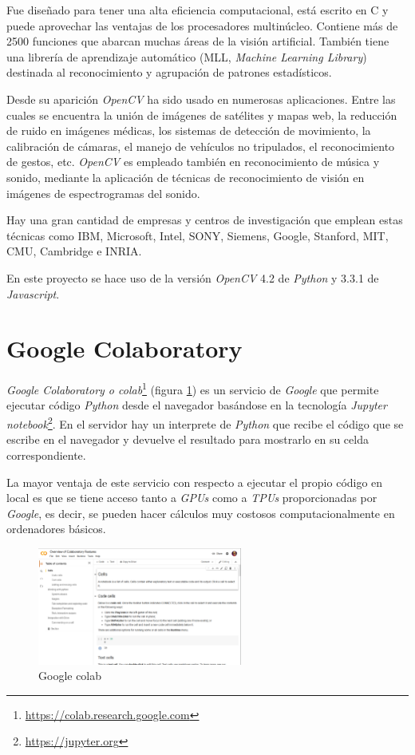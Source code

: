 Fue diseñado para tener una alta eficiencia computacional, está escrito en C y puede aprovechar las ventajas de los procesadores multinúcleo. Contiene más  de  2500  funciones  que  abarcan  muchas  áreas  de  la  visión  artificial.  También  tiene  una librería   de   aprendizaje   automático   (MLL,  \textit{Machine   Learning   Library})   destinada   al reconocimiento  y agrupación de patrones estadísticos.

Desde su aparición \textit{OpenCV} ha sido usado en numerosas aplicaciones. Entre las cuales se encuentra la unión de imágenes de satélites y mapas web, la reducción de ruido en imágenes  médicas,  los  sistemas  de  detección  de movimiento,  la  calibración  de  cámaras,  el manejo  de  vehículos  no  tripulados, el  reconocimiento  de  gestos, etc. \textit{OpenCV} es empleado también en reconocimiento de música y sonido, mediante la aplicación de técnicas de reconocimiento de visión en imágenes de espectrogramas del sonido.

Hay  una  gran  cantidad  de  empresas    y  centros  de  investigación  que  emplean  estas técnicas como IBM, Microsoft, Intel, SONY, Siemens, Google, Stanford, MIT, CMU, Cambridge e INRIA.

En este proyecto se hace uso de la versión \textit{OpenCV} 4.2 de \textit{Python} y 3.3.1 de \textit{Javascript}.
\section{Google Colaboratory}
\textit{Google Colaboratory o colab}\footnote{\url{https://colab.research.google.com}} (figura \ref{fig:colab})  es un servicio de \textit{Google} que permite ejecutar código \textit{Python} desde el navegador basándose en la tecnología \textit{Jupyter notebook}\footnote{\url{https://jupyter.org}}. En el servidor hay un interprete de \textit{Python} que recibe el código que se escribe en el navegador y devuelve el resultado para mostrarlo en su celda correspondiente.

La mayor ventaja de este servicio con respecto a ejecutar el propio código en local es que se tiene acceso tanto a \textit{GPUs} como a \textit{TPUs} proporcionadas por \textit{Google}, es decir, se pueden hacer cálculos muy costosos computacionalmente en ordenadores básicos.

\begin{figure}[H]
  \begin{center}
    \includegraphics[width=0.6\textwidth]{figures/herramientas/colab.png}
		\caption{Google colab}
		\label{fig:colab}
		\end{center}
\end{figure}
